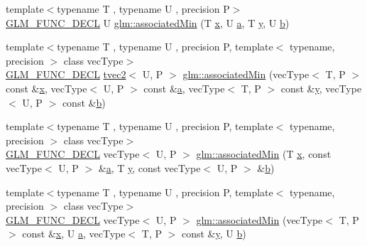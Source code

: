 \begin{DoxyCompactItemize}
\item 
{\footnotesize template$<$typename T , typename U , precision P$>$ }\\\mbox{\hyperlink{setup_8hpp_ab2d052de21a70539923e9bcbf6e83a51}{G\+L\+M\+\_\+\+F\+U\+N\+C\+\_\+\+D\+E\+CL}} U \mbox{\hyperlink{group__gtx__associated__min__max_gacc01bd272359572fc28437ae214a02df}{glm\+::associated\+Min}} (T \mbox{\hyperlink{glad_8h_a92d0386e5c19fb81ea88c9f99644ab1d}{x}}, U \mbox{\hyperlink{glad_8h_ac8729153468b5dcf13f971b21d84d4e5}{a}}, T \mbox{\hyperlink{glad_8h_a66ddd433d2cacfe27f5906b7e86faeed}{y}}, U \mbox{\hyperlink{glad_8h_a6eba317e3cf44d6d26c04a5a8f197dcb}{b}})
\item 
{\footnotesize template$<$typename T , typename U , precision P, template$<$ typename, precision $>$ class vec\+Type$>$ }\\\mbox{\hyperlink{setup_8hpp_ab2d052de21a70539923e9bcbf6e83a51}{G\+L\+M\+\_\+\+F\+U\+N\+C\+\_\+\+D\+E\+CL}} \mbox{\hyperlink{structglm_1_1tvec2}{tvec2}}$<$ U, P $>$ \mbox{\hyperlink{group__gtx__associated__min__max_ga8b538d10872626668a078e2bd495af25}{glm\+::associated\+Min}} (vec\+Type$<$ T, P $>$ const \&\mbox{\hyperlink{glad_8h_a92d0386e5c19fb81ea88c9f99644ab1d}{x}}, vec\+Type$<$ U, P $>$ const \&\mbox{\hyperlink{glad_8h_ac8729153468b5dcf13f971b21d84d4e5}{a}}, vec\+Type$<$ T, P $>$ const \&\mbox{\hyperlink{glad_8h_a66ddd433d2cacfe27f5906b7e86faeed}{y}}, vec\+Type$<$ U, P $>$ const \&\mbox{\hyperlink{glad_8h_a6eba317e3cf44d6d26c04a5a8f197dcb}{b}})
\item 
{\footnotesize template$<$typename T , typename U , precision P, template$<$ typename, precision $>$ class vec\+Type$>$ }\\\mbox{\hyperlink{setup_8hpp_ab2d052de21a70539923e9bcbf6e83a51}{G\+L\+M\+\_\+\+F\+U\+N\+C\+\_\+\+D\+E\+CL}} vec\+Type$<$ U, P $>$ \mbox{\hyperlink{group__gtx__associated__min__max_ga1dccff48fa5650c746533de83467da6e}{glm\+::associated\+Min}} (T \mbox{\hyperlink{glad_8h_a92d0386e5c19fb81ea88c9f99644ab1d}{x}}, const vec\+Type$<$ U, P $>$ \&\mbox{\hyperlink{glad_8h_ac8729153468b5dcf13f971b21d84d4e5}{a}}, T \mbox{\hyperlink{glad_8h_a66ddd433d2cacfe27f5906b7e86faeed}{y}}, const vec\+Type$<$ U, P $>$ \&\mbox{\hyperlink{glad_8h_a6eba317e3cf44d6d26c04a5a8f197dcb}{b}})
\item 
{\footnotesize template$<$typename T , typename U , precision P, template$<$ typename, precision $>$ class vec\+Type$>$ }\\\mbox{\hyperlink{setup_8hpp_ab2d052de21a70539923e9bcbf6e83a51}{G\+L\+M\+\_\+\+F\+U\+N\+C\+\_\+\+D\+E\+CL}} vec\+Type$<$ U, P $>$ \mbox{\hyperlink{group__gtx__associated__min__max_ga076717f4e07c6ae725cc1382d1ac4869}{glm\+::associated\+Min}} (vec\+Type$<$ T, P $>$ const \&\mbox{\hyperlink{glad_8h_a92d0386e5c19fb81ea88c9f99644ab1d}{x}}, U \mbox{\hyperlink{glad_8h_ac8729153468b5dcf13f971b21d84d4e5}{a}}, vec\+Type$<$ T, P $>$ const \&\mbox{\hyperlink{glad_8h_a66ddd433d2cacfe27f5906b7e86faeed}{y}}, U \mbox{\hyperlink{glad_8h_a6eba317e3cf44d6d26c04a5a8f197dcb}{b}})

\end{DoxyCompactItemize}
